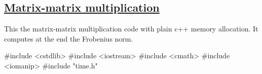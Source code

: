\documentclass[%
oneside,                 %
final,                   %
10pt]{article}
\begin{document}
\ecppcode


\subsection{\href{{https://github.com/CompPhysics/ComputationalPhysicsMSU/blob/master/doc/Programs/LecturePrograms/programs/Classes/cpp/program9.cpp}}{Matrix-matrix multiplication}}
This the matrix-matrix multiplication code with plain c++ memory allocation. It computes at the end the Frobenius norm.



































































\bdat
#include <cstdlib>
#include <iostream>
#include <cmath>
#include <iomanip>
#include "time.h"
\end{document}
